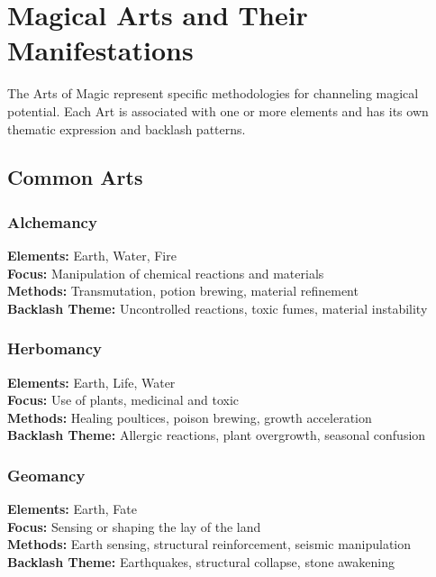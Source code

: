 \section{Magical Arts and Their Manifestations}

The Arts of Magic represent specific methodologies for channeling magical potential. Each Art is associated with one or more elements and has its own thematic expression and backlash patterns.

\subsection{Common Arts}

\subsubsection{Alchemancy}
\textbf{Elements:} Earth, Water, Fire\\
\textbf{Focus:} Manipulation of chemical reactions and materials\\
\textbf{Methods:} Transmutation, potion brewing, material refinement\\
\textbf{Backlash Theme:} Uncontrolled reactions, toxic fumes, material instability

\subsubsection{Herbomancy}
\textbf{Elements:} Earth, Life, Water\\
\textbf{Focus:} Use of plants, medicinal and toxic\\
\textbf{Methods:} Healing poultices, poison brewing, growth acceleration\\
\textbf{Backlash Theme:} Allergic reactions, plant overgrowth, seasonal confusion

\subsubsection{Geomancy}
\textbf{Elements:} Earth, Fate\\
\textbf{Focus:} Sensing or shaping the lay of the land\\
\textbf{Methods:} Earth sensing, structural reinforcement, seismic manipulation\\
\textbf{Backlash Theme:} Earthquakes, structural collapse, stone awakening

